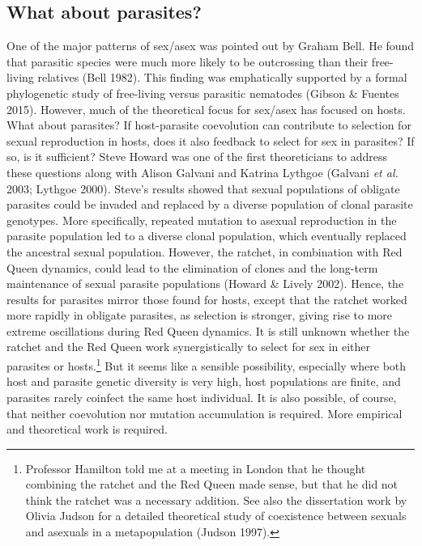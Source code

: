 \documentclass[
  letterpaper,
]{book}
\begin{document}
\subsection{What about parasites?}\label{what-about-parasites}

One of the major patterns of sex/asex was pointed out by Graham Bell. He
found that parasitic species were much more likely to be outcrossing
than their free-living relatives (Bell 1982). This finding was
emphatically supported by a formal phylogenetic study of free-living
versus parasitic nematodes (Gibson \& Fuentes 2015). However, much of
the theoretical focus for sex/asex has focused on hosts. What about
parasites? If host-parasite coevolution can contribute to selection for
sexual reproduction in hosts, does it also feedback to select for sex in
parasites? If so, is it sufficient? Steve Howard was one of the first
theoreticians to address these questions along with Alison Galvani and
Katrina Lythgoe (Galvani \emph{et al.} 2003; Lythgoe 2000). Steve's
results showed that sexual populations of obligate parasites could be
invaded and replaced by a diverse population of clonal parasite
genotypes. More specifically, repeated mutation to asexual reproduction
in the parasite population led to a diverse clonal population, which
eventually replaced the ancestral sexual population. However, the
ratchet, in combination with Red Queen dynamics, could lead to the
elimination of clones and the long-term maintenance of sexual parasite
populations (Howard \& Lively 2002). Hence, the results for parasites
mirror those found for hosts, except that the ratchet worked more
rapidly in obligate parasites, as selection is stronger, giving rise to
more extreme oscillations during Red Queen dynamics. It is still unknown
whether the ratchet and the Red Queen work synergistically to select for
sex in either parasites or hosts.\footnote{Professor Hamilton told me at
  a meeting in London that he thought combining the ratchet and the Red
  Queen made sense, but that he did not think the ratchet was a
  necessary addition. See also the dissertation work by Olivia Judson
  for a detailed theoretical study of coexistence between sexuals and
  asexuals in a metapopulation (Judson 1997).} But it seems like a
sensible possibility, especially where both host and parasite genetic
diversity is very high, host populations are finite, and parasites
rarely coinfect the same host individual. It is also possible, of
course, that neither coevolution nor mutation accumulation is required.
More empirical and theoretical work is required.
\end{document}
